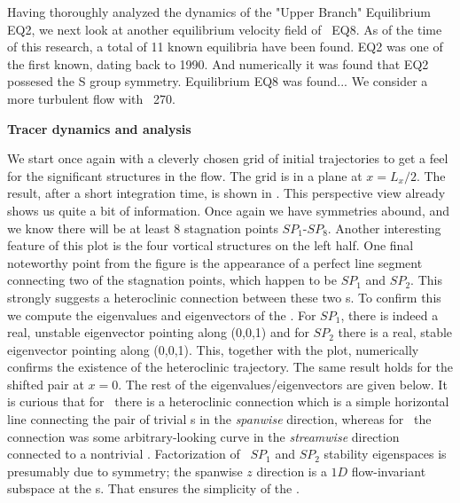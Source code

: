 \documentclass[letter,10pt,openany]{article}
\begin{document}
   Having thoroughly analyzed the dynamics of the "Upper Branch" Equilibrium EQ2, we next look at another equilibrium velocity field of \pCf\, EQ8. As of the time of this research, a total of 11 known equilibria have been found. EQ2 was one of the first known, dating back to 1990. And numerically it was found that EQ2 possesed the S group symmetry. Equilibrium EQ8 was found... We consider a more turbulent flow with \Reynolds\ 270. \\


\begin{large}
\noindent \textbf{Tracer dynamics and analysis} \\
\end{large}

 We start once again with a cleverly chosen grid of initial
 trajectories to get a feel for the significant structures in the
 flow. The grid is
 in a plane at $x = L_{x}/2$. The result, after a short integration
 time, is shown in . This perspective
 view already shows us quite a bit of information. Once again we
 have symmetries abound, and we know there will be at least 8 stagnation points $SP_1$-$SP_8$.  Another interesting feature of this
 plot is the four vortical structures on the left half. One final noteworthy point
  from the figure is the appearance of a perfect line segment connecting two of the
 stagnation points, which happen to be $SP_1$ and $SP_2$. 
  This strongly suggests a heteroclinic
 connection between these two \stagp s. To confirm this we
 compute the eigenvalues and eigenvectors of the \velgradmat. For
 $SP_1$, there is
 indeed a real, unstable eigenvector pointing along (0,0,1) and for
 $SP_2$ there is a real, stable eigenvector pointing along (0,0,1).
 This, together with the plot, numerically confirms the existence of the heteroclinic trajectory. The same result  holds for the shifted pair at $x = 0$. The rest of the eigenvalues/eigenvectors are given
 below. It is curious that for \tEQeight\ there is a heteroclinic connection which is a simple
 horizontal line connecting the pair of trivial \stagp s in the
 \textit{spanwise} direction, whereas for \tUB\ the connection was some
 arbitrary-looking curve in the \textit{streamwise} direction connected to a nontrivial
 \stagp. Factorization of \tEQeight\
$SP_1$ and $SP_2$ stability eigenspaces is presumably due to symmetry; the spanwise $z$ direction is a $1D$ flow-invariant subspace at
the \stagp s. That ensures the simplicity of the \hec.
\end{document}
